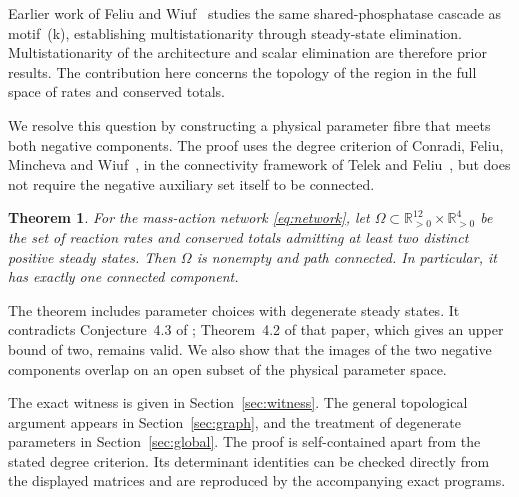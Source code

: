 \documentclass[11pt,a4paper]{article}
\numberwithin{equation}{section}
\newtheorem{theorem}{Theorem}[section]
\theoremstyle{remark}\newtheorem{remark}[theorem]{Remark}
\newcommand{\pos}{\mathbb{R}_{>0}}
\newcommand{\Om}{\Omega}
\begin{document}
Earlier work of Feliu and Wiuf~\cite{FW} studies the same shared-phosphatase cascade as motif~(k), establishing multistationarity through steady-state elimination. Multistationarity of the architecture and scalar elimination are therefore prior results. The contribution here concerns the topology of the region in the full space of rates and conserved totals.

We resolve this question by constructing a physical parameter fibre that meets both negative components. The proof uses the degree criterion of Conradi, Feliu, Mincheva and Wiuf~\cite{CFMW}, in the connectivity framework of Telek and Feliu~\cite{TF}, but does not require the negative auxiliary set itself to be connected.

\begin{theorem}\label{thm:main}
For the mass-action network \eqref{eq:network}, let $\Om\subset\pos^{12}\times\pos^4$ be the set of reaction rates and conserved totals admitting at least two distinct positive steady states. Then $\Om$ is nonempty and path connected. In particular, it has exactly one connected component.
\end{theorem}

The theorem includes parameter choices with degenerate steady states. It contradicts Conjecture~4.3 of \cite[version~1]{KW}; Theorem~4.2 of that paper, which gives an upper bound of two, remains valid. We also show that the images of the two negative components overlap on an open subset of the physical parameter space.

The exact witness is given in Section~\ref{sec:witness}. The general topological argument appears in Section~\ref{sec:graph}, and the treatment of degenerate parameters in Section~\ref{sec:global}. The proof is self-contained apart from the stated degree criterion. Its determinant identities can be checked directly from the displayed matrices and are reproduced by the accompanying exact programs.
\end{document}
